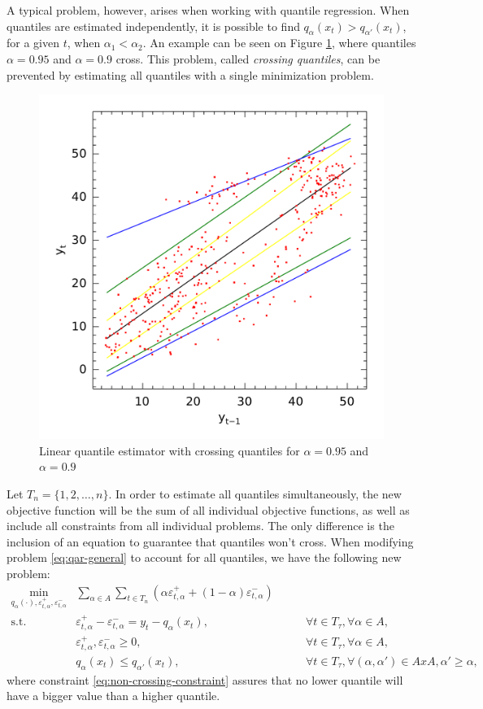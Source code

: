 A typical problem, however, arises when working with quantile regression. When quantiles are estimated independently, it is possible to find $q_{\alpha}(x_t) > q_{\alpha'}(x_t)$, for a given $t$, when $\alpha_1 < \alpha_2$. An example can be seen on Figure \ref{fig:crossing-quantiles}, where quantiles $\alpha = 0.95$ and $\alpha = 0.9$ cross. This problem, called \textit{crossing quantiles}, can be prevented by estimating all quantiles with a single minimization problem.
\begin{figure}
	\centering
	\includegraphics[width=0.6\linewidth]{./Figuras/npqar/icaraizinho-crossing-200}
	\caption{Linear quantile estimator with crossing quantiles for $\alpha = 0.95$ and $\alpha = 0.9$}
	\label{fig:crossing-quantiles}
\end{figure}

 Let $T_n = \{1, 2, \dots, n\}$. In order to estimate all quantiles simultaneously, the new objective function will be the sum of all individual objective functions, as well as include all constraints from all individual problems. The only difference is the inclusion of an equation to guarantee that quantiles won't cross. When modifying problem \ref{eq:qar-general} to account for all quantiles, we have the following new problem:
\begin{eqnarray}
\label{eq:non-crossing-quantiles1}
\min_{q_\alpha(\cdot),\varepsilon_{t,\alpha}^{+}, \varepsilon_{t,\alpha}^{-}} &  \sum_{\alpha \in A} \sum_{t \in T_n}\left(\alpha \varepsilon_{t,\alpha}^{+}+(1-\alpha)\varepsilon_{t,\alpha}^{-}\right) &  \\
\mbox{s.t. } & \varepsilon_{t,\alpha}^{+}-\varepsilon_{t,\alpha}^{-}=y_{t}-q_\alpha(x_{t}), & \qquad\forall t \in T_\tau,\forall \alpha \in A,\\
& \varepsilon_{t,\alpha}^+,\varepsilon_{t,\alpha}^- \geq 0, & \qquad\forall t \in T_\tau,\forall \alpha \in A,\\\label{eq:non-crossing-constraint}
& q_{\alpha}(x_t) \leq q_{\alpha'}(x_t), & \qquad \forall t \in T_\tau, \forall (\alpha, \alpha') \in AxA,  \alpha' \geq \alpha,
\end{eqnarray}
where constraint \ref{eq:non-crossing-constraint} assures that no lower quantile will have a bigger value than a higher quantile.




